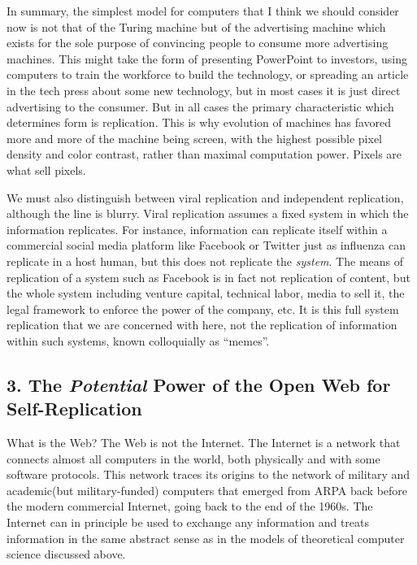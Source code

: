 \documentclass[12pt,a4paper]{amsart}
\numberwithin{equation}{section}
\begin{document}
In summary, the simplest model for computers that I think we should
consider now is not that of the Turing machine but of the advertising
machine which exists for the sole purpose of convincing people to
consume more advertising machines. This might take the form of
presenting PowerPoint to investors, using computers to train the
workforce to build the technology, or spreading an article in the tech
press about some new technology, but in most cases it is just direct
advertising to the consumer. But in all cases the primary characteristic
which determines form is replication. This is why evolution of machines
has favored more and more of the machine being screen, with the highest
possible pixel density and color contrast, rather than maximal
computation power. Pixels are what sell pixels.

We must also distinguish between viral replication and independent
replication, although the line is blurry. Viral replication assumes a
fixed system in which the information replicates. For instance,
information can replicate itself within a commercial social media
platform like Facebook or Twitter just as influenza can replicate in a
host human, but this does not replicate the \emph{system}. The means of
replication of a system such as Facebook is in fact not replication of
content, but the whole system including venture capital, technical
labor, media to sell it, the legal framework to enforce the power of the
company, etc. It is this full system replication that we are concerned
with here, not the replication of information within such systems, known
colloquially as ``memes''.

\subsection{\texorpdfstring{3. The \emph{Potential} Power of the Open
Web for
Self-Replication}{3. The Potential Power of the Open Web for Self-Replication}}\label{the-potential-power-of-the-open-web-for-self-replication}

What is the Web? The Web is not the Internet. The Internet is a network
that connects almost all computers in the world, both physically and
with some software protocols. This network traces its origins to the
network of military and academic(but military-funded) computers that
emerged from ARPA back before the modern commercial Internet, going back
to the end of the 1960s. The Internet can in principle be used to
exchange any information and treats information in the same abstract
sense as in the models of theoretical computer science discussed above.
\end{document}
